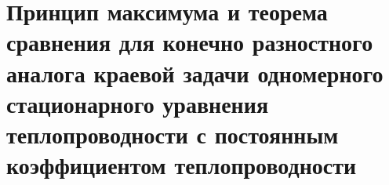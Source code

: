 \documentclass[__main__.tex]{subfiles}
\begin{document}
\section{Принцип максимума и теорема сравнения для конечно разностного аналога краевой задачи одномерного стационарного уравнения теплопроводности с постоянным коэффициентом теплопроводности}
\end{document}
